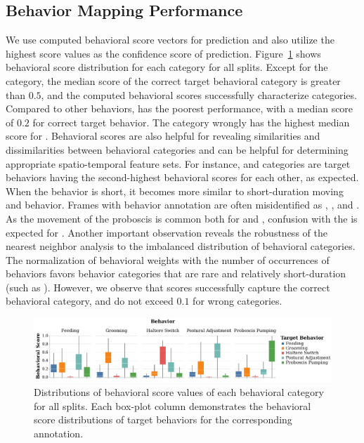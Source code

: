 \subsection{Behavior Mapping Performance}
We use computed behavioral score vectors for prediction and also utilize the highest score values as the confidence score of prediction.
Figure~\ref{figure:behavioral-score-distributions} shows behavioral score distribution for each category for all splits.
Except for the \Feeding category, the median score of the correct target behavioral category is greater than $0.5$, and the computed behavioral scores successfully characterize categories.
Compared to other behaviors, \Feeding has the poorest performance, with a median score of $0.2$ for correct target behavior.
The \PosturalAdjustment category wrongly has the highest median score for \Feeding.
Behavioral scores are also helpful for revealing similarities and dissimilarities between behavioral categories and can be helpful for determining appropriate spatio-temporal feature sets.
For instance, \Grooming and \PosturalAdjustment categories are target behaviors having the second-highest behavioral scores for each other, as expected.
When the \Grooming behavior is short, it becomes more similar to short-duration moving and \PosturalAdjustment behavior.
Frames with \Feeding behavior annotation are often misidentified as \PosturalAdjustment, \Grooming, and \ProboscisPumping.
As the movement of the proboscis is common both for \Feeding and \ProboscisPumping, confusion with the \ProboscisPumping is expected for \Feeding.
Another important observation reveals the robustness of the nearest neighbor analysis to the imbalanced distribution of behavioral categories.
The normalization of behavioral weights with the number of occurrences of behaviors favors behavior categories that are rare and relatively short-duration (such as \HaltereSwitch). However, we observe that \HaltereSwitch scores successfully capture the correct behavioral category, and do not exceed $0.1$ for wrong categories.

\begin{figure}[htb!]
	\centering
	\includegraphics[width=\linewidth]{figures/BehavioralScoresDistributions_perBehavior.pdf}
	\caption[Distributions of behavioral score values of each behavioral category for all splits together.]{Distributions of behavioral score values of each behavioral category for all splits.
		Each box-plot column demonstrates the behavioral score distributions of target behaviors for the corresponding annotation.\label{figure:behavioral-score-distributions}}
\end{figure}

